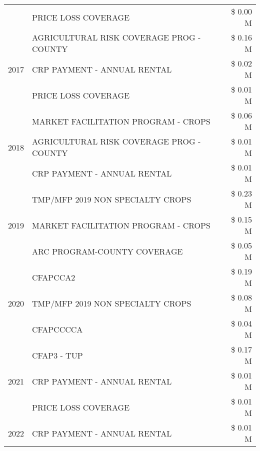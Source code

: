 \begin{tabular}{llr}
 & PRICE LOSS COVERAGE & \$ 0.00 M \\
\cline{1-3}
\multirow[t]{3}{*}{2017} & AGRICULTURAL RISK COVERAGE PROG - COUNTY & \$ 0.16 M \\
 & CRP PAYMENT - ANNUAL RENTAL & \$ 0.02 M \\
 & PRICE LOSS COVERAGE & \$ 0.01 M \\
\cline{1-3}
\multirow[t]{3}{*}{2018} & MARKET FACILITATION PROGRAM - CROPS & \$ 0.06 M \\
 & AGRICULTURAL RISK COVERAGE PROG - COUNTY & \$ 0.01 M \\
 & CRP PAYMENT - ANNUAL RENTAL & \$ 0.01 M \\
\cline{1-3}
\multirow[t]{3}{*}{2019} & TMP/MFP 2019 NON SPECIALTY CROPS & \$ 0.23 M \\
 & MARKET FACILITATION PROGRAM - CROPS & \$ 0.15 M \\
 & ARC PROGRAM-COUNTY COVERAGE & \$ 0.05 M \\
\cline{1-3}
\multirow[t]{3}{*}{2020} & CFAPCCA2 & \$ 0.19 M \\
 & TMP/MFP 2019 NON SPECIALTY CROPS & \$ 0.08 M \\
 & CFAPCCCCA & \$ 0.04 M \\
\cline{1-3}
\multirow[t]{3}{*}{2021} & CFAP3 - TUP & \$ 0.17 M \\
 & CRP PAYMENT - ANNUAL RENTAL & \$ 0.01 M \\
 & PRICE LOSS COVERAGE & \$ 0.01 M \\
\cline{1-3}
2022 & CRP PAYMENT - ANNUAL RENTAL & \$ 0.01 M \\
\cline{1-3}
\bottomrule
\end{tabular}
